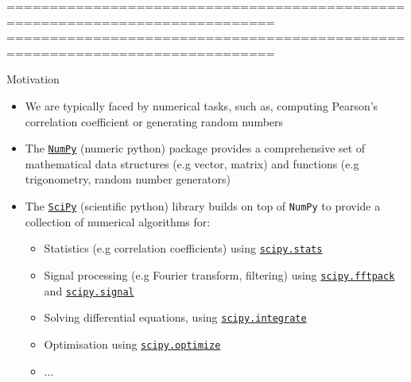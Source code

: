 \documentclass[xcolor=table]{beamer}
\begin{document}
=============================================================================%
=============================================================================%
\begin{frame}{Motivation}

\begin{itemize}\addtolength{\itemsep}{\baselineskip}
	\item<1-> We are typically faced by numerical tasks, 
	such as, computing Pearson's correlation coefficient
	or generating random numbers

\item<2-> The \href{https://docs.scipy.org/doc/numpy/user/quickstart.html}{\texttt{NumPy}} (numeric python) package provides a comprehensive set of mathematical data structures (e.g vector, matrix)
	and functions (e.g trigonometry, random number generators) 

	\item<3-> The \href{https://docs.scipy.org/doc/scipy/reference/}{\texttt{SciPy}} (scientific python) library builds on top of \texttt{NumPy} to provide a collection of numerical algorithms for: 
	\begin{itemize}
        \item<4-> Statistics (e.g correlation coefficients) using \href{https://docs.scipy.org/doc/scipy/reference/tutorial/stats.html}{\texttt{scipy.stats}} 
        \item<5-> Signal processing (e.g Fourier transform, filtering) using \href{https://docs.scipy.org/doc/scipy/reference/tutorial/fftpack.html}{\texttt{scipy.fftpack}} and \href{https://docs.scipy.org/doc/scipy/reference/tutorial/signal.html}{\texttt{scipy.signal}} 
        \item<6-> Solving differential equations, using \href{https://docs.scipy.org/doc/scipy/reference/integrate.html}{\texttt{scipy.integrate}} 
        \item<7-> Optimisation using \href{https://docs.scipy.org/doc/scipy/reference/tutorial/optimize.html}{\texttt{scipy.optimize}} 
		\item<8-> $\ldots$
	\end{itemize}
\end{itemize}
\end{frame}
\end{document}
